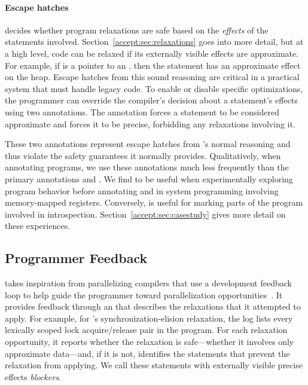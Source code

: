 \paragraph{Escape hatches}
\sysname decides whether program relaxations are safe based on the
\emph{effects} of the statements involved. Section~\ref{accept:sec:relaxations} goes
into more detail, but at a high level, code can be relaxed if its externally
visible effects are approximate.  For example, if  is a pointer to
an , then the statement  has an approximate effect
on the heap.
Escape hatches from this sound reasoning are critical in a practical
system that must handle legacy code.
To enable or disable specific optimizations, the programmer can
override the compiler's decision about a statement's effects using two
annotations. The \annpermit annotation forces a statement to
be considered approximate
and \annforbid forces it to be precise, forbidding
any relaxations involving it.

These two annotations represent escape hatches from \sysname's normal
reasoning and thus violate the safety guarantees it normally provides.
%
Qualitatively, when annotating programs, we use these
annotations much less frequently than the primary annotations
 and . We find \annpermit to be
useful when experimentally exploring program behavior before annotating and in
system programming involving memory-mapped registers.  Conversely,
\annforbid is useful for marking parts of the program involved in
introspection. Section~\ref{accept:sec:casestudy} gives more detail on these
experiences.

\subsection{Programmer Feedback}
\label{accept:sec:feedback}

\sysname takes inspiration from parallelizing compilers that use a development
feedback loop to help guide the programmer toward parallelization
opportunities~\cite{canal, deditor}.
It provides
feedback through an  that describes the relaxations that it
attempted to apply. For example, for \sysname's synchronization-elision
relaxation, the log lists every lexically scoped lock acquire/release pair in
the program. For each relaxation opportunity, it reports whether the relaxation
is safe---whether it involves only approximate data---and, if it is
not, identifies the statements that prevent the relaxation from applying.
We call these statements with
externally visible precise effects \emph{blockers}.

